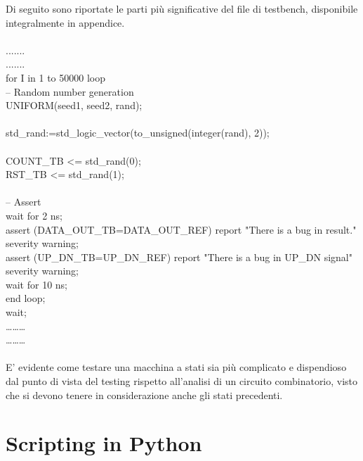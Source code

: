 Di seguito sono riportate le parti più significative del file di testbench, disponibile integralmente in appendice.\\
\\
.......\\
.......\\
for I in 1 to 50000 loop\\
-- Random number generation\\
UNIFORM(seed1, seed2, rand);\\
\\
std\_rand:=std\_logic\_vector(to\_unsigned(integer(rand), 2));\\
\\
COUNT\_TB    <= std\_rand(0);\\
RST\_TB    <= std\_rand(1); \\
\\
-- Assert\\
wait for 2 ns;\\
assert (DATA\_OUT\_TB=DATA\_OUT\_REF) report "There is a bug in result." severity warning;\\
assert (UP\_DN\_TB=UP\_DN\_REF) report "There is a bug in UP\_DN signal" severity warning;\\
wait for 10 ns;\\
end loop;\\
wait;\\
………\\
………\\
\\
E' evidente come testare una macchina a stati sia più complicato e dispendioso dal punto di vista del testing rispetto all'analisi di un circuito combinatorio, visto che si devono tenere in considerazione anche gli stati precedenti.\\ 
\section{Scripting in Python}
